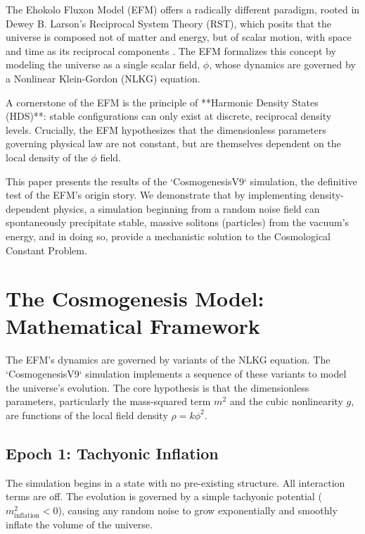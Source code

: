 \documentclass[11pt, twoside]{article}
\begin{document}
The Ehokolo Fluxon Model (EFM) offers a radically different paradigm, rooted in Dewey B. Larson's Reciprocal System Theory (RST), which posits that the universe is composed not of matter and energy, but of scalar motion, with space and time as its reciprocal components \citep{larson1959}. The EFM formalizes this concept by modeling the universe as a single scalar field, \(\phi\), whose dynamics are governed by a Nonlinear Klein-Gordon (NLKG) equation.

A cornerstone of the EFM is the principle of **Harmonic Density States (HDS)**: stable configurations can only exist at discrete, reciprocal density levels. Crucially, the EFM hypothesizes that the dimensionless parameters governing physical law are not constant, but are themselves dependent on the local density of the \(\phi\) field.

This paper presents the results of the `CosmogenesisV9` simulation, the definitive test of the EFM's origin story. We demonstrate that by implementing density-dependent physics, a simulation beginning from a random noise field can spontaneously precipitate stable, massive solitons (particles) from the vacuum's energy, and in doing so, provide a mechanistic solution to the Cosmological Constant Problem.

\section{The Cosmogenesis Model: Mathematical Framework}
The EFM's dynamics are governed by variants of the NLKG equation. The `CosmogenesisV9` simulation implements a sequence of these variants to model the universe's evolution. The core hypothesis is that the dimensionless parameters, particularly the mass-squared term \(m^2\) and the cubic nonlinearity \(g\), are functions of the local field density \(\rho = k\phi^2\).

\subsection{Epoch 1: Tachyonic Inflation}
The simulation begins in a state with no pre-existing structure. All interaction terms are off. The evolution is governed by a simple tachyonic potential (\(m_{\text{inflation}}^2 < 0\)), causing any random noise to grow exponentially and smoothly inflate the volume of the universe.
\end{document}
